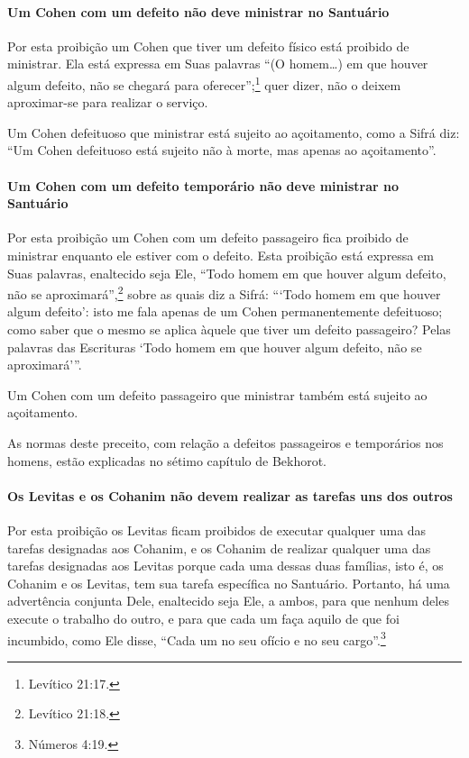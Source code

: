 \paragraph{Um Cohen com um defeito não deve ministrar no Santuário}

Por esta proibição um Cohen que tiver um defeito físico está
proibido de ministrar. Ela está expressa em Suas palavras ``(O homem\ldots{})
em que houver algum defeito, não se chegará para oferecer'';\footnote{Levítico
21:17.} quer dizer, não o deixem aproximar-se para realizar o serviço.

Um Cohen defeituoso que ministrar está sujeito ao açoitamento, como
a Sifrá diz: ``Um Cohen defeituoso está sujeito não à morte, mas
apenas ao açoitamento''.

\paragraph{Um Cohen com um defeito temporário não deve ministrar no Santuário}

Por esta proibição um Cohen com um defeito passageiro fica proibido
de ministrar enquanto ele estiver com o defeito. Esta proibição está
expressa em Suas palavras, enaltecido seja Ele, ``Todo homem em que
houver algum defeito, não se aproximará'',\footnote{Levítico 21:18.} sobre as
quais diz a Sifrá: ```Todo homem em que houver algum defeito': isto me
fala apenas de um Cohen permanentemente defeituoso; como saber que o mesmo se aplica àquele que tiver um defeito passageiro? Pelas palavras das Escrituras `Todo homem
em que houver algum defeito, não se aproximará'''.

Um Cohen com um defeito passageiro que ministrar também está
sujeito ao açoitamento.

As normas deste preceito, com relação a defeitos passageiros e
temporários nos homens, estão explicadas no sétimo capítulo de Bekhorot.

\paragraph{Os Levitas e os Cohanim não devem realizar as tarefas uns dos outros}

Por esta proibição os Levitas ficam proibidos de executar qualquer uma
das tarefas designadas aos Cohanim, e os Cohanim de realizar
qualquer uma das tarefas designadas aos Levitas porque cada uma dessas
duas famílias, isto é, os Cohanim e os Levitas, tem sua tarefa
específica no Santuário. Portanto, há uma advertência conjunta Dele,
enaltecido seja Ele, a ambos, para que nenhum deles execute o trabalho
do outro, e para que cada um faça aquilo de que foi incumbido, como Ele
disse, ``Cada um no seu ofício e no seu cargo''.\footnote{Números 4:19.}


